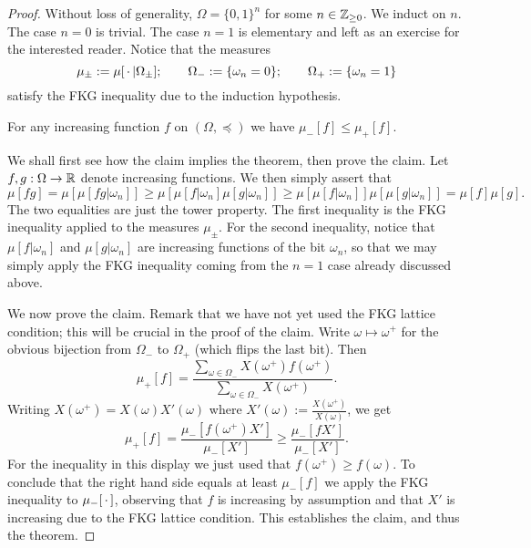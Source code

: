 \begin{proof}
    Without loss of generality, $\Omega=\{0,1\}^n$ for some $n\in\mathbb Z_{\geq 0}$.
    We induct on $n$.
    The case $n=0$ is trivial.
    The case $n=1$ is elementary and left as an exercise for the interested reader.
    Notice that the measures
    \[
        \mu_\pm:=\mu[\,\cdot\,|\Omega_\pm];
        \qquad
        \Omega_-:=\{\omega_n=0\};
        \qquad
        \Omega_+:=\{\omega_n=1\}
    \]
    satisfy the FKG inequality due to the induction hypothesis.

    \begin{claim*}
    For any increasing function $f$  on $(\Omega,\preceq)$ we have \(
            \mu_-[f]\leq\mu_+[f]
        \).
    \end{claim*}

    We shall first see how the claim implies the theorem,
    then prove the claim.
    Let $f,g:\Omega\to\mathbb R$ denote increasing functions.
    We then simply assert that
    \[
        \mu[fg] = \mu[\mu[fg|\omega_n]]
        \geq
        \mu[\mu[f|\omega_n]\mu[g|\omega_n]]
        \geq
        \mu[\mu[f|\omega_n]]\mu[\mu[g|\omega_n]]
        =
        \mu[f]\mu[g].
    \]
    The two equalities are just the tower property.
    The first inequality is the FKG inequality applied
    to the measures $\mu_\pm$.
    For the second inequality, notice that $\mu[f|\omega_n]$
    and $\mu[g|\omega_n]$ are increasing functions
    of the bit $\omega_n$,
    so that we may simply apply the FKG inequality
    coming from the $n=1$ case already discussed above.

    We now prove the claim.
    Remark that we have not yet used the FKG lattice condition;
    this will be crucial in the proof of the claim.
    Write $\omega\mapsto \omega^+$ for the obvious bijection
    from $\Omega_-$ to $\Omega_+$ (which flips the last bit).
    Then
    \[
        \mu_+[ f]
        =
        \frac{\sum_{\omega\in\Omega_-}X(\omega^+)f(\omega^+)}{\sum_{\omega\in\Omega_-}X(\omega^+)}.
    \]
    Writing $X(\omega^+)=X(\omega)X'(\omega)$
    where
    $X'(\omega):=\frac{X(\omega^+)}{X(\omega)}$,
    we get 
    \[
        \mu_+[ f]
        =
        \frac{\mu_-[ f(\omega^+) X']}{\mu_-[ X']}
        \geq
        \frac{\mu_-[ f X']}{\mu_-[ X']}
        .
    \]
    For the inequality in this display we just used that $f(\omega^+)\geq f(\omega)$.
    To conclude that the right hand side equals at least $\mu_-[ f]$
    we apply the FKG inequality to $\mu_-[\,\cdot\,]$,
    observing that $f$ is increasing by assumption and that $X'$ is increasing
    due to the FKG lattice condition.
    This establishes the claim, and thus the theorem.
\end{proof}
